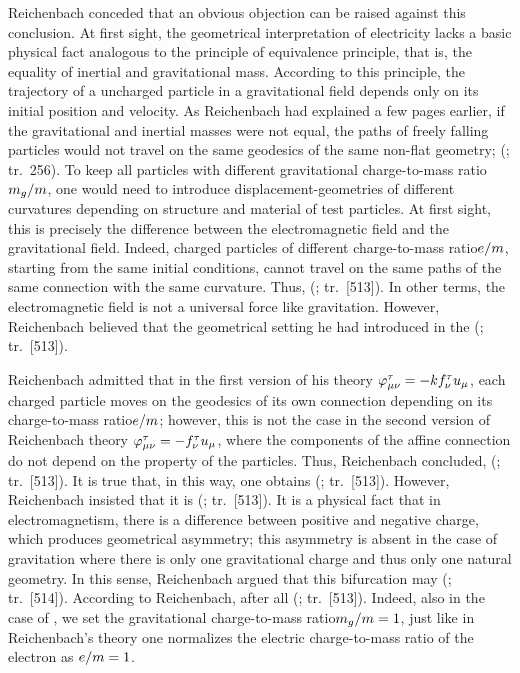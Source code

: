 \documentclass[submitted]{article}
\newcommand{\ctmr}{charge-to-mass ratio\xspace}
\newcommand{\ctmrf}{\ensuremath{\hfrac{e}{m}}\xspace}
\newcommand{\ctmrg}{\ensuremath{\hfrac{m_g}{m}}\xspace}
\newcommand{\RTo}{\ensuremath{\varphi\tmn=-k f^\tau_\nu u_\mu}\xspace}
\newcommand{\RTt}{\ensuremath{\varphi\tmn=-f^\tau_\nu u_\mu}\xspace}
\renewcommand{\me}{;~m.e.{}}
\renewcommand{\rzlp}[2]{(\cite[#1]{Reichenbach1928}; tr.\ #2)\xspace}
\renewcommand{\rzlap}[2]{(\cite[#1]{Reichenbach1928}; tr.\ [#2])\xspace}
\begin{document}
Reichenbach conceded that an obvious objection can be raised against this conclusion. At first sight, the geometrical interpretation of electricity lacks a basic physical fact analogous to the principle of equivalence principle, that is, the equality of inertial and gravitational mass. According to this principle, the trajectory of a uncharged particle in a gravitational field depends only on its initial position and velocity. As Reichenbach had explained a few pages earlier, if the gravitational and inertial masses were not equal, the paths of freely falling particles would not travel on the same geodesics of the same non-flat \spti geometry;  \rzlp{293\me}{256}. To keep all particles with different gravitational \ctmr \ctmrg, one would need to introduce displacement-geometries of different curvatures depending on structure and material of test particles. At first sight, this is precisely the difference between the electromagnetic field and the gravitational field. Indeed, charged particles of different \ctmr \ctmrf, starting from the same initial conditions, cannot travel on the same paths of the same connection with the same curvature. Thus,  \rzlap{367}{513}. In other terms, the electromagnetic field is not a universal force like gravitation. However, Reichenbach believed that the geometrical setting he had introduced in the \Ap {} \rzlap{367\me}{513}. 

Reichenbach admitted that in the first version of his theory \RTo, each charged particle moves on the geodesics of its own connection depending on its \ctmr \ctmrf; however, this is not the case in the second version of Reichenbach theory \RTt, where the components of the affine connection do not depend on the property of the particles. Thus, Reichenbach concluded,  \rzlap{367}{513}. It is true that, in this way, one obtains  \rzlap{367}{513}. However, Reichenbach insisted that it is  \rzlap{367}{513}. It is a physical fact that in electromagnetism, there is a difference between positive and negative charge, which produces geometrical asymmetry; this asymmetry is absent in the case of gravitation where there is only one gravitational charge and thus only one natural geometry. In this sense, Reichenbach argued that this bifurcation may  \rzlap{367\me}{514}. According to Reichenbach, after all \rzlap{367}{513}. Indeed, also in the case of \gr, we set the gravitational \ctmr $\ctmrg=1$, just like in Reichenbach's theory one normalizes the electric \ctmr of the electron as $\ctmrf = 1$.
\end{document}
